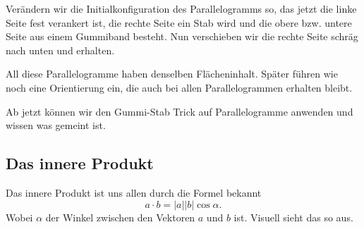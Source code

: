 \documentclass[fleqn]{scrartcl}
\numberwithin{equation}{section}
\begin{document}
Verändern wir die Initialkonfiguration des Parallelogramms so, das jetzt
die linke Seite fest verankert ist, die rechte Seite ein Stab wird und die
obere bzw. untere Seite aus einem Gummiband besteht. Nun verschieben wir die
rechte Seite schräg nach unten und erhalten.
\begin{center}
\begin{minipage}{\linewidth}
\centering
{}
\label{fig:gummiUndStab3}
\end{minipage}
\end{center}
All diese Parallelogramme haben denselben Flächeninhalt. Später führen wie
noch eine Orientierung ein, die auch bei allen Parallelogrammen erhalten
bleibt.

Ab jetzt können wir den Gummi-Stab Trick auf Parallelogramme anwenden und
wissen was gemeint ist.
\newpage
\subsection{Das innere Produkt}
Das innere Produkt ist uns allen durch die Formel bekannt
\[a\cdot b = |a||b|\cos\alpha. \]
Wobei $\alpha$ der Winkel zwischen den Vektoren $a$ und $b$ ist. Visuell sieht
das so aus.
\begin{center}
\begin{minipage}{\linewidth}
\centering
{}
\label{fig:innerProduct}
\end{minipage}
\end{center}
\end{document}
